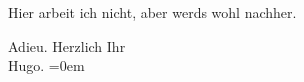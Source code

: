\pstart
           Hier arbeit ich nicht, aber werds wohl nachher.\pend
           
\pstart
           Adieu. Herzlich Ihr{\\[\baselineskip]}\spacefill\mbox{Hugo.}\pend
           \leftskip=0em{}\endnumbering{}  \newcommand{\dateiname}{L00508}\newcommand{\titel}{Hugo von Hofmannsthal an Arthur Schnitzler, 17. 10. [1895]}\newcommand{\editorInnen}{Martin Anton Müller und Gerd-Hermann Susen}
